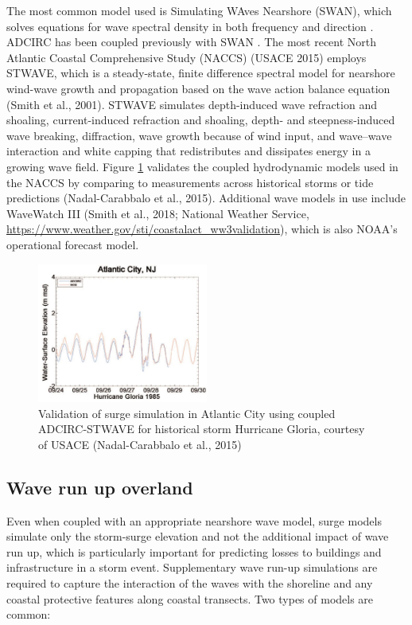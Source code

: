 The most common model used is Simulating WAves Nearshore (SWAN), which solves equations for wave spectral density in both frequency and direction \citep{zijlema2010a}. ADCIRC has been coupled previously with SWAN \citep{dietrich2011a,kennedyTropical2012}. The most recent North Atlantic Coastal Comprehensive Study (NACCS) (USACE 2015) employs STWAVE, which is a steady-state, finite difference spectral model for nearshore wind-wave growth and propagation based on the wave action balance equation (Smith et al., 2001). STWAVE simulates depth-induced wave refraction and shoaling, current-induced refraction and shoaling, depth- and steepness-induced wave breaking, diffraction, wave growth because of wind input, and wave–wave interaction and white capping that redistributes and dissipates energy in a growing wave field. Figure \ref{fig:surge_validation} validates the coupled hydrodynamic models used in the NACCS by comparing to measurements across historical storms or tide predictions (Nadal-Carabbalo et al., 2015). Additional wave models in use include WaveWatch III (Smith et al., 2018; National Weather Service, \url{https://www.weather.gov/sti/coastalact\_ww3validation}), which is also NOAA’s operational forecast model. 

\begin{figure}[htb]
    \centering
    \includegraphics[width=0.5\textwidth, angle = 0]{Figures/surge_validation.png}
    \caption{Validation of surge simulation in Atlantic City using coupled ADCIRC-STWAVE for historical storm Hurricane Gloria, courtesy of USACE (Nadal-Carabbalo et al., 2015)}
    \label{fig:surge_validation}
\end{figure}

\subsection{Wave run up overland}

Even when coupled with an appropriate nearshore wave model, surge models simulate only the storm-surge elevation and not the additional impact of wave run up, which is particularly important for predicting losses to buildings and infrastructure in a storm event. Supplementary wave run-up simulations are required to capture the interaction of the waves with the shoreline and any coastal protective features along coastal transects. Two types of models are common:


